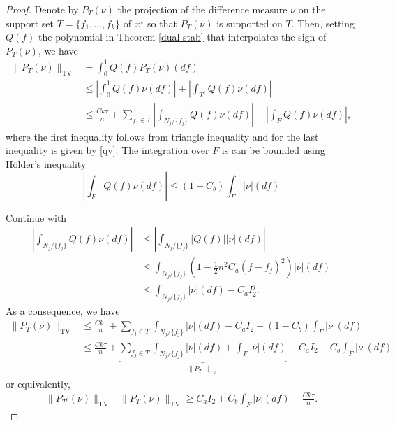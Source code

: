 \begin{proof}\label{apx:pf:I2far}
Denote by $P_T(\nu)$ the projection of the difference measure $\nu$ on the support set $T = \{f_1, \ldots, f_k\}$ of $x^\star$ so that $P_T(\nu)$ is supported on $T$. Then, setting $Q(f)$ the polynomial in Theorem \ref{dual-stab} that interpolates the sign of $P_T( \nu)$, we have
{
\begin{align*}
  \| P_T ( \nu) \|_{\mathrm{TV}} & =  \int_0^1 Q ( f) P_T ( \nu) ( d f)\\
  & \leq  \left| \int_0^1 Q ( f) \nu ( d f) \right| + \left|
  \int_{T^c} Q ( f) \nu ( d f) \right|\\
  & \leq  \frac{C k \tau}{n} + \sum_{f_j \in T} \left|
  \int_{N_j / \{ f_j \}} Q ( f) \nu ( d f) \right| + \left|
  \int_F Q ( f) \nu ( d f) \right|,
\end{align*}}
where the first inequality follows from triangle inequality and for the last inequality is given by \eqref{qv}. 
The integration over $F$ is can be bounded using H\"{o}lder's inequality
\[
  \left| \int_{F} Q ( f) \nu ( d f) \right|  
  \leq  ( 1 - C_b) \int_F |\nu|(df)
\]

Continue with
{
\begin{align*}
  \left| \int_{N_j / \{ f_j \}} Q ( f) \nu ( d f) \right| 
  & \leq  \left| \int_{N_j / \{ f_j \}} | Q ( f) | | \nu | ( d f) \right|\\
  & \leq  \int_{N_j / \{ f_j \}} ( 1 - \tfrac{1}{2}n^2 C_a ( f - f_j)^2) | \nu | ( d f)\\
  & \leq \int_{N_j / \{ f_j \}} | \nu | ( d f) - C_a I_2^j.
\end{align*}
}
As a consequence, we have
{
\begin{align*}
  \nonumber \| P_T ( \nu) \|_{\mathrm{TV}} & \leq  \frac{C k \tau}{n} + \sum_{f_j
  \in T} \int_{N_j / \{ f_j \}} | \nu | ( d f) - C_a
  I_2 + ( 1 - C_b) \int_F |\nu|(df) \nonumber\\
 & \leq  \frac{C k \tau}{n} + \underbrace{\sum_{f_j
  \in T} \int_{N_j / \{ f_j \}} | \nu | ( d f) + \int_F |\nu|(df)}_{\|P_{T^c}\|_{\mathrm{TV}}} - C_a
 I_2  - C_b \int_F |\nu|(df)
\end{align*}
}
or equivalently,
\begin{align}
  \label{eqn:lower}
\|P_{T^c}(\nu) \|_{\mathrm{TV}} - \|P_T(\nu)\|_{\mathrm{TV}} \geq C_a I_2 + C_b \int_F |\nu|(df) - \frac{C k\tau}{n}.
\end{align}


\end{proof}
